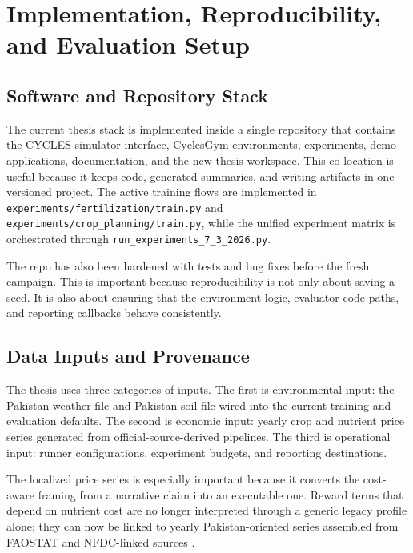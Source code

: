 \chapter{Implementation, Reproducibility, and Evaluation Setup}

\section{Software and Repository Stack}

The current thesis stack is implemented inside a single repository that contains the CYCLES simulator interface, CyclesGym environments, experiments, demo applications, documentation, and the new thesis workspace. This co-location is useful because it keeps code, generated summaries, and writing artifacts in one versioned project. The active training flows are implemented in \texttt{experiments/fertilization/train.py} and \texttt{experiments/crop\_planning/train.py}, while the unified experiment matrix is orchestrated through \texttt{run\_experiments\_7\_3\_2026.py}.

The repo has also been hardened with tests and bug fixes before the fresh campaign. This is important because reproducibility is not only about saving a seed. It is also about ensuring that the environment logic, evaluator code paths, and reporting callbacks behave consistently.

\section{Data Inputs and Provenance}

The thesis uses three categories of inputs. The first is environmental input: the Pakistan weather file and Pakistan soil file wired into the current training and evaluation defaults. The second is economic input: yearly crop and nutrient price series generated from official-source-derived pipelines. The third is operational input: runner configurations, experiment budgets, and reporting destinations.

The localized price series is especially important because it converts the cost-aware framing from a narrative claim into an executable one. Reward terms that depend on nutrient cost are no longer interpreted through a generic legacy profile alone; they can now be linked to yearly Pakistan-oriented series assembled from FAOSTAT and NFDC-linked sources \citep{faostatprices2026,nfdcprices2026}.



